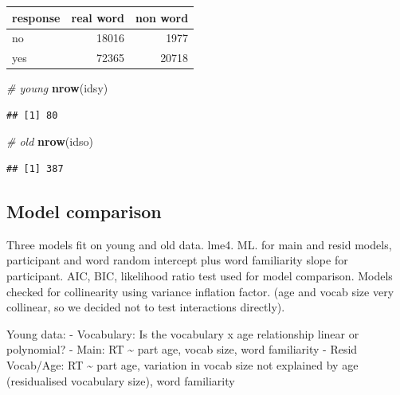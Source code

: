\documentclass[
]{article}
\newenvironment{Shaded}{\begin{snugshade}}{\end{snugshade}}
\newcommand{\CommentTok}[1]{\textcolor[rgb]{0.56,0.35,0.01}{\textit{#1}}}
\newcommand{\FunctionTok}[1]{\textcolor[rgb]{0.13,0.29,0.53}{\textbf{#1}}}
\newcommand{\NormalTok}[1]{#1}
\begin{document}
\begin{longtable}[]{@{}lrr@{}}
\toprule\noalign{}
response & real word & non word \\
\midrule\noalign{}
\endhead
\bottomrule\noalign{}
\endlastfoot
no & 18016 & 1977 \\
yes & 72365 & 20718 \\
\end{longtable}

\begin{Shaded}
\begin{Highlighting}[]
\CommentTok{\# young}
\FunctionTok{nrow}\NormalTok{(idsy)}
\end{Highlighting}
\end{Shaded}

\begin{verbatim}
## [1] 80
\end{verbatim}

\begin{Shaded}
\begin{Highlighting}[]
\CommentTok{\# old}
\FunctionTok{nrow}\NormalTok{(idso)}
\end{Highlighting}
\end{Shaded}

\begin{verbatim}
## [1] 387
\end{verbatim}

\subsection{Model comparison}\label{model-comparison}

Three models fit on young and old data. lme4. ML. for main and resid
models, participant and word random intercept plus word familiarity
slope for participant. AIC, BIC, likelihood ratio test used for model
comparison. Models checked for collinearity using variance inflation
factor. (age and vocab size very collinear, so we decided not to test
interactions directly).

Young data: - Vocabulary: Is the vocabulary x age relationship linear or
polynomial? - Main: RT \textasciitilde{} part age, vocab size, word
familiarity - Resid Vocab/Age: RT \textasciitilde{} part age, variation
in vocab size not explained by age (residualised vocabulary size), word
familiarity
\end{document}

